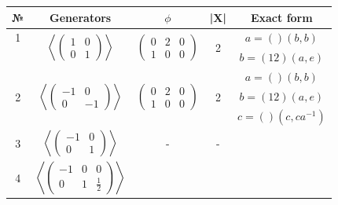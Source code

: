 \documentclass[a4paper,12pt]{amsart}
\begin{document}
	
	\begin{table}[h]
		\begin{tabular}{|c|c|c|c|c|}
			\hline
			№ & \textbf{Generators} &  \textbf{$\phi$} & \textbf{|X|} & Exact form \\
			\hline 
			
			
			1 & \multirow{2}{*}{$\left\langle 
					\begin{pmatrix}
						1 & 0 \\ 
						0 & 1 
					\end{pmatrix} 			
				\right\rangle$
			}
			   & \multirow{2}{*}{$\left(\begin{array}{cc|c}
			   	0 & 2 & 0\\ 
			   	1 & 0  & 0
			\end{array}\right)$  
		   	}
		   	   & \multirow{2}{*}{2} & $a = () (b, b) $\\
		   	   
		   	   &  & & & $b = (12)(a, e)$      \\
		   
		   \multirow{3}{*}{2} & \multirow{3}{*}{$\left\langle 
		   	\begin{pmatrix}
		   		-1 & 0 \\ 
		   		0 & -1 
		   	\end{pmatrix} 			
		   	\right\rangle$
		   }
		   	& \multirow{3}{*}{$\left(\begin{array}{cc|c}
		   		0 & 2  & 0\\ 
		   		1 & 0  & 0
		   	\end{array}\right)$  
		   }
		   	& \multirow{3}{*}{2} & $a = () (b, b)$\\
		   	& & & & $b = (12)(a, e)$\\
		   	& & & & $c = ()(c, ca^{-1})$\\
		   	
		   3 & $\left\langle 
		   	\begin{pmatrix}
		   		-1 & 0 \\ 
		   		0 & 1 
		   	\end{pmatrix} 			
		   	\right\rangle$
		   	
		   	& -
		   	& - & \\
		   	
		  4 & $\left\langle 
		   \left(\begin{array}{cc|c}
		   	-1 & 0  & 0 \\ 
		   	0 & 1   & \frac{1}{2}
		  \end{array}\right) 			
		   \right\rangle$
		   

\end{tabular}
\end{table}
\end{document}
